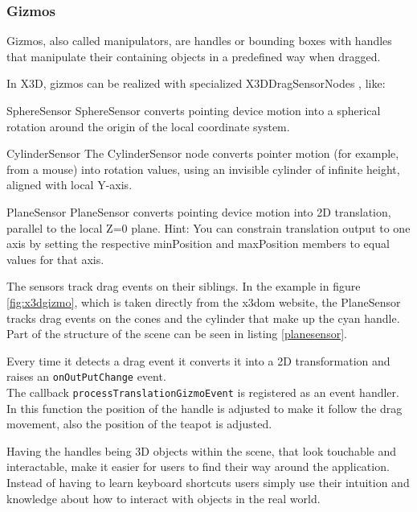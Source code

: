 \subsubsection{Gizmos}\label{gizmos}

Gizmos, also called manipulators, are handles or bounding boxes with
handles that manipulate their containing objects in a predefined way when
dragged. \cite{wikigizmo}

In \gls{X3D}, gizmos can be realized with specialized X3DDragSensorNodes \cite{x3ddragsensornode}, like:

\begin{description*}
\item[SphereSensor]
  SphereSensor converts pointing device motion into a spherical rotation around the origin of the local coordinate system. \cite{spheresensor}
\item[CylinderSensor]
  The CylinderSensor node converts pointer motion (for example, from a mouse) into rotation values, using an invisible cylinder of infinite height, aligned with local Y-axis. \cite{cylindersensor}
\item[PlaneSensor]
  PlaneSensor converts pointing device motion into 2D translation, parallel to the local Z=0 plane. Hint: You can constrain translation output to one axis by setting the respective minPosition and maxPosition members to equal values for that axis. \cite{planesensor}
\end{description*}

The sensors track drag events on their siblings. In the example in figure
\ref{fig:x3dgizmo}, which is taken directly from the x3dom website, the
PlaneSensor tracks drag events on the cones and the cylinder that make up the
cyan handle. Part of the structure of the scene can be seen in listing
\ref{planesensor}.

Every time it detects a drag event it converts it into a 2D
transformation and raises an \texttt{onOutPutChange} event.\\
The callback \texttt{processTranslationGizmoEvent} is registered as an event handler.
In this function the position of the handle is adjusted to make it
follow the drag movement, also the position of the teapot is adjusted.

Having the handles being \gls{3D} objects within the scene, that look
touchable and interactable, make it easier for users to find their way
around the application. Instead of having to learn keyboard shortcuts
users simply use their intuition and knowledge about how to interact with
objects in the real world.

